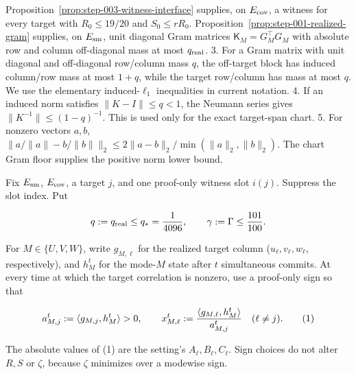 Proposition~\ref{prop:step-003-witness-interface} supplies, on
\(E_{\rm cov}\), a witness for every target with \(R_0\le19/20\) and
\(S_0\le rR_0\). Proposition~\ref{prop:step-001-realized-gram} supplies, on
\(E_{\rm sm}\), unit diagonal Gram matrices
\(\mathsf K_M=G_M^\top G_M\) with absolute row and column off-diagonal mass at
most \(q_{\rm real}\).
3. For a Gram matrix with unit diagonal and off-diagonal row/column mass
   \(q\), the off-target block has induced column/row mass at most \(1+q\),
   while the target row/column has mass at most \(q\). We use the elementary
   induced-\(\ell_1\) inequalities in current notation.
4. If an induced norm satisfies \(\|K-I\|\le q<1\), the Neumann series gives
   \(\|K^{-1}\|\le(1-q)^{-1}\). This is used only for the exact target-span
   chart.
5. For nonzero vectors \(a,b\),
   \(\|a/\|a\|-b/\|b\|\|_2\le
   2\|a-b\|_2/\min(\|a\|_2,\|b\|_2)\). The chart Gram floor supplies the
   positive norm lower bound.

Fix \(E_{\rm sm}\), \(E_{\rm cov}\), a target \(j\), and one proof-only witness
slot \(i(j)\). Suppress the slot index. Put

\[
q:=q_{\rm real}\le q_*={1\over4096},\qquad
\gamma:=\Gamma\le {101\over100}.
\]

For \(M\in\{U,V,W\}\), write \(g_{M,\ell}\) for the realized target column
(\(u_\ell,v_\ell,w_\ell\), respectively), and \(h_M^t\) for the mode-\(M\)
state after \(t\) simultaneous commits. At every time at which the target
correlation is nonzero, use a proof-only sign so that

\[
a_{M,j}^t:=\langle g_{M,j},h_M^t\rangle>0,\qquad
x_{M,\ell}^t:={\langle g_{M,\ell},h_M^t\rangle\over a_{M,j}^t}
\quad(\ell\ne j).
\tag{1}
\]

The absolute values of (1) are the setting's \(A_\ell,B_\ell,C_\ell\).
Sign choices do not alter \(R,S\) or \(\zeta\), because \(\zeta\) minimizes
over a modewise sign.


